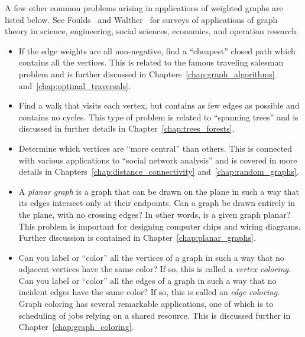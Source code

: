 A few other common problems arising in applications of weighted graphs
are listed below. See Foulds~\cite{Foulds1992} and
Walther~\cite{Walther1984} for surveys of applications of graph theory
in science, engineering, social sciences, economics, and operation
research.

\begin{itemize}
\item If the edge weights are all non-negative, find a ``cheapest''
  closed path which contains all the vertices. This is related to the
  famous traveling salesman problem and is further discussed in
  Chapters~\ref{chap:graph_algorithms} and~\ref{chap:optimal_traversals}.

\item Find a walk that visits each vertex, but contains as few edges
  as possible and contains no cycles. This type of problem is related
  to ``spanning trees'' and is discussed in further details in
  Chapter~\ref{chap:trees_forests}.

\item Determine which vertices are ``more central'' than others. This
  is connected with various applications to
  ``social network analysis'' and is covered in more details in
  Chapters~\ref{chap:distance_connectivity}
  and~\ref{chap:random_graphs}.

\item A \emph{planar graph} is a graph that can be drawn on the plane
  in such a way that its edges intersect only at their endpoints. Can
  a graph be drawn entirely in the plane, with no crossing edges? In
  other words, is a given graph planar? This problem is important for
  designing computer chips and wiring diagrams. Further discussion is
  contained in Chapter~\ref{chap:planar_graphs}.

\item Can you label or ``color'' all the vertices of a graph in such a
  way that no adjacent vertices have the same color? If so, this is
  called a \emph{vertex coloring}. Can you label or ``color'' all the
  edges of a graph in such a way that no incident edges have the same
  color? If so, this is called an \emph{edge coloring}. Graph coloring
  has several remarkable applications, one of which is to scheduling
  of jobs relying on a shared resource. This is discussed further in
  Chapter~\ref{chap:graph_coloring}.


\end{itemize}

